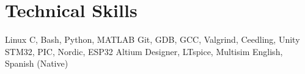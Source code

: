 \section{Technical Skills}
  \resumeHeaderItemListStart
        {Linux}
        {C, Bash, Python, MATLAB}
        {Git, GDB, GCC, Valgrind, Ceedling, Unity}
        {STM32, PIC, Nordic, ESP32}
        {Altium Designer, LTspice, Multisim}
        {English, Spanish (Native)}
  \resumeHeaderItemListEnd
  
